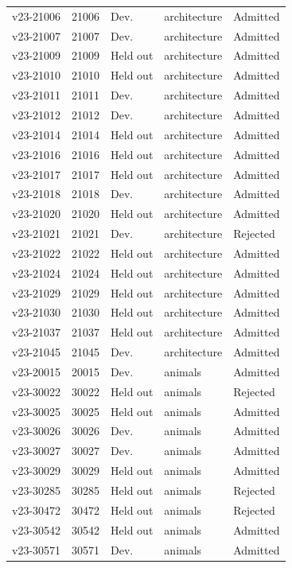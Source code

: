 \begin{longtable}{lllp{}l}
v23-21006 & 21006 & Dev. & architecture & Admitted\\
v23-21007 & 21007 & Dev. & architecture & Admitted\\
v23-21009 & 21009 & Held out & architecture & Admitted\\
v23-21010 & 21010 & Held out & architecture & Admitted\\
v23-21011 & 21011 & Dev. & architecture & Admitted\\
v23-21012 & 21012 & Dev. & architecture & Admitted\\
v23-21014 & 21014 & Held out & architecture & Admitted\\
v23-21016 & 21016 & Held out & architecture & Admitted\\
v23-21017 & 21017 & Held out & architecture & Admitted\\
v23-21018 & 21018 & Dev. & architecture & Admitted\\
v23-21020 & 21020 & Held out & architecture & Admitted\\
v23-21021 & 21021 & Dev. & architecture & Rejected\\
v23-21022 & 21022 & Held out & architecture & Admitted\\
v23-21024 & 21024 & Held out & architecture & Admitted\\
v23-21029 & 21029 & Held out & architecture & Admitted\\
v23-21030 & 21030 & Held out & architecture & Admitted\\
v23-21037 & 21037 & Held out & architecture & Admitted\\
v23-21045 & 21045 & Dev. & architecture & Admitted\\
v23-20015 & 20015 & Dev. & animals & Admitted\\
v23-30022 & 30022 & Held out & animals & Rejected\\
v23-30025 & 30025 & Held out & animals & Admitted\\
v23-30026 & 30026 & Dev. & animals & Admitted\\
v23-30027 & 30027 & Dev. & animals & Admitted\\
v23-30029 & 30029 & Held out & animals & Admitted\\
v23-30285 & 30285 & Held out & animals & Rejected\\
v23-30472 & 30472 & Held out & animals & Rejected\\
v23-30542 & 30542 & Held out & animals & Admitted\\
v23-30571 & 30571 & Dev. & animals & Admitted\\

\end{longtable}

